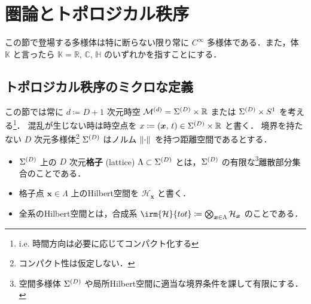 \documentclass[TQFT_main]{subfiles}
\begin{document}
\setcounter{chapter}{3}

\chapter{圏論とトポロジカル秩序}

この節で登場する多様体は特に断らない限り常に $C^\infty$ 多様体である．また，体 $\mathbb{K}$ と言ったら $\mathbb{K} = \mathbb{R},\, \mathbb{C},\, \mathbb{H}$ のいずれかを指すことにする．

\section{トポロジカル秩序のミクロな定義}


この節では常に $d \coloneqq D+1$ 次元時空 $\mathcal{M}^{(d)} = \Sigma^{(D)} \times \mathbb{R}$ または $\Sigma^{(D)} \times S^1$ を考える\footnote{i.e. 時間方向は必要に応じてコンパクト化する}．
混乱が生じない時は時空点を $x \coloneqq (\bm{x},\, t) \in \Sigma^{(D)} \times \mathbb{R}$ と書く．
境界を持たない $D$ 次元多様体\footnote{コンパクト性は仮定しない．} $\Sigma^{(D)}$ はノルム $\norm*{\cdot}$ を持つ距離空間であるとする．

\begin{itemize}
    \item $\Sigma^{(D)}$ 上の $D$ 次元\textbf{格子} (lattice) $\Lambda \subset \Sigma^{(D)}$ とは，$\Sigma^{(D)}$ の有限な\footnote{空間多様体 $\Sigma^{(D)}$ や局所Hilbert空間に適当な境界条件を課して有限にする．}離散部分集合のことである．
    \item 格子点 $\bm{x} \in \Lambda$ 上のHilbert空間を $\mathcal{H}_{\bm{x}}$ と書く．
    \item 全系のHilbert空間とは，合成系 $\irm{\mathcal{H}}{tot} \coloneqq \bigotimes_{\bm{x} \in \Lambda} \mathcal{H}_{\bm{x}}$ のことである．
\end{itemize}
\end{document}
